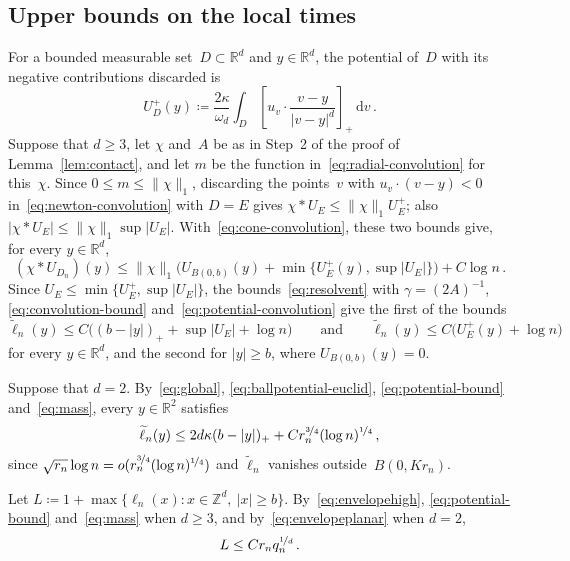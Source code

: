 \documentclass[11pt]{amsart}
\theoremstyle{plain}
\theoremstyle{definition}
\newcommand{\Z}{\mathbb Z}
\newcommand{\R}{\mathbb R}
\newcommand{\drift}{\kappa}
\newcommand{\dd}{\,\mathrm d}
\newcommand{\nf}{\nicefrac}
\numberwithin{equation}{section}
\begin{document}
\subsection{Upper bounds on the local times}

For a bounded measurable set~$D\subset\R^d$ and $y\in\R^d$, the potential of~$D$ with its negative contributions discarded is
\begin{equation*}
U_D^+(y)\coloneqq\frac{2\drift}{\omega_d}\int_D\left[u_v\cdot\frac{v-y}{|v-y|^d}\right]_+\dd v\, .
\end{equation*}
Suppose that $d\geq3$, let $\chi$ and~$A$ be as in Step~2 of the proof of Lemma~\ref{lem:contact}, and let $m$ be the function in~\eqref{eq:radial-convolution} for this~$\chi$. Since $0\leq m\leq\|\chi\|_1$, discarding the points~$v$ with $u_v\cdot(v-y)<0$ in~\eqref{eq:newton-convolution} with $D=E$ gives $\chi*U_E\leq\|\chi\|_1U_E^+$; also $|\chi*U_E|\leq\|\chi\|_1\sup|U_E|$. With~\eqref{eq:cone-convolution}, these two bounds give, for every $y\in\R^d$,
\begin{equation}\label{eq:potential-convolution}
(\chi*U_{D_n})(y)\leq\|\chi\|_1\bigl(U_{B(0,b)}(y)+\min\{U_E^+(y),\sup|U_E|\}\bigr)+C\log n\, .
\end{equation}
Since $U_E\leq\min\{U_E^+,\sup|U_E|\}$, the bounds~\eqref{eq:resolvent} with $\gamma=(2A)^{-1}$, \eqref{eq:convolution-bound} and~\eqref{eq:potential-convolution} give the first of the bounds
\begin{equation}\label{eq:envelopehigh}
\widetilde\ell_n(y)\leq C\bigl((b-|y|)_++\sup|U_E|+\log n\bigr)
\qquad\text{and}\qquad
\widetilde\ell_n(y)\leq C\bigl(U_E^+(y)+\log n\bigr)
\end{equation}
for every $y\in\R^d$, and the second for $|y|\geq b$, where $U_{B(0,b)}(y)=0$.

Suppose that $d=2$. By~\eqref{eq:global}, \eqref{eq:ballpotential-euclid}, \eqref{eq:potential-bound} and~\eqref{eq:mass}, every $y\in\R^2$ satisfies
\begin{equation}\label{eq:envelopeplanar}
\widetilde\ell_n(y)\leq2d\drift(b-|y|)_++Cr_n^{\nf34}(\log n)^{\nf14}\, ,
\end{equation}
since $\sqrt{r_n}\log n=o(r_n^{\nf34}(\log n)^{\nf14})$ and $\widetilde\ell_n$ vanishes outside~$B(0,Kr_n)$.

Let $L\coloneqq1+\max\{\ell_n(x):x\in\Z^d,\ |x|\geq b\}$. By~\eqref{eq:envelopehigh}, \eqref{eq:potential-bound} and~\eqref{eq:mass} when $d\geq3$, and by~\eqref{eq:envelopeplanar} when $d=2$,
\begin{equation}\label{eq:shellW}
L\leq Cr_nq_n^{\nf1d}\, .
\end{equation}
\end{document}
